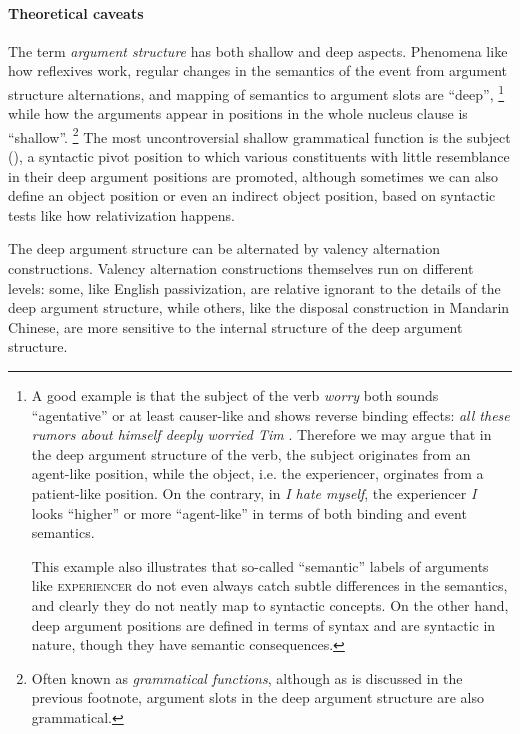 \documentclass[a4paper, oneside, 12pt]{report}
\newcommand*{\term}[1]{\emph{#1}}
\newcommand{\form}[1]{\emph{#1}}
\newcommand*{\category}[1]{\textsc{#1}}
\begin{document}
\paragraph*{Theoretical caveats}
The term \term{argument structure} has both shallow and deep aspects.
Phenomena like how reflexives work,
regular changes in the semantics of the event from argument structure alternations,
and mapping of semantics to argument slots are ``deep'',%
\footnote{
    A good example is that the subject of the verb \form{worry}
    both sounds ``agentative'' or at least causer-like and shows reverse binding effects:
    \form{all these rumors about himself deeply worried Tim} \citep{hornstein2002psych}.
    Therefore we may argue that in the deep argument structure of the verb,
    the subject originates from an agent-like position,
    while the object, i.e. the experiencer, orginates from a patient-like position.
    On the contrary, in \form{I hate myself},
    the experiencer \form{I} looks ``higher'' or more ``agent-like''
    in terms of both binding and event semantics.

    This example also illustrates that so-called ``semantic'' labels of arguments like \category{experiencer}
    do not even always catch subtle differences in the semantics,
    and clearly they do not neatly map to syntactic concepts.
    On the other hand, deep argument positions are defined in terms of syntax and are syntactic in nature,
    though they have semantic consequences.
}
while how the arguments appear in positions in the whole nucleus clause is ``shallow''.%
\footnote{
    Often known as \term{grammatical functions},
    although as is discussed in the previous footnote,
    argument slots in the deep argument structure are also grammatical.
}
The most uncontroversial shallow grammatical function is the subject (),
a syntactic pivot position to which various constituents with little resemblance in their deep argument positions are promoted,
although sometimes we can also define an object position or even an indirect object position,
based on syntactic tests like how relativization happens.

The deep argument structure can be alternated by valency alternation constructions.
Valency alternation constructions themselves run on different levels:
some, like English passivization, are relative ignorant to the details of the deep argument structure,
while others, like the disposal construction in Mandarin Chinese,
are more sensitive to the internal structure of the deep argument structure.
\end{document}
